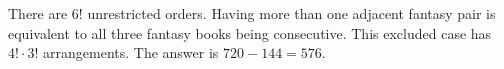 There are $6!$ unrestricted orders. Having more than one adjacent fantasy pair is equivalent to all three fantasy books being consecutive. This excluded case has $4!\cdot3!$ arrangements. The answer is $720-144=\boxed{576}$.
